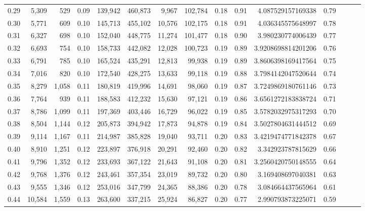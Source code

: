 \begin{tabular}{rrrrrrrrrrrrrrr}
0.29 &   5,309 &    529 &  0.09 &  139,942 &  460,873 &    9,967 &  102,784 &  0.18 &  0.91 &     4.087529157169338 &      0.79 \\
0.30 &   5,771 &    609 &  0.10 &  145,713 &  455,102 &   10,576 &  102,175 &  0.18 &  0.91 &     4.036345575648997 &      0.78 \\
0.31 &   6,327 &    698 &  0.10 &  152,040 &  448,775 &   11,274 &  101,477 &  0.18 &  0.90 &     3.980230774006439 &      0.77 \\
0.32 &   6,693 &    754 &  0.10 &  158,733 &  442,082 &   12,028 &  100,723 &  0.19 &  0.89 &    3.9208698814201206 &      0.76 \\
0.33 &   6,791 &    785 &  0.10 &  165,524 &  435,291 &   12,813 &   99,938 &  0.19 &  0.89 &    3.8606398169417564 &      0.75 \\
0.34 &   7,016 &    820 &  0.10 &  172,540 &  428,275 &   13,633 &   99,118 &  0.19 &  0.88 &    3.7984142047520644 &      0.74 \\
0.35 &   8,279 &  1,058 &  0.11 &  180,819 &  419,996 &   14,691 &   98,060 &  0.19 &  0.87 &    3.7249869180761146 &      0.73 \\
0.36 &   7,764 &    939 &  0.11 &  188,583 &  412,232 &   15,630 &   97,121 &  0.19 &  0.86 &    3.6561272183838724 &      0.71 \\
0.37 &   8,786 &  1,099 &  0.11 &  197,369 &  403,446 &   16,729 &   96,022 &  0.19 &  0.85 &    3.5782032975317293 &      0.70 \\
0.38 &   8,504 &  1,144 &  0.12 &  205,873 &  394,942 &   17,873 &   94,878 &  0.19 &  0.84 &    3.5027804631444512 &      0.69 \\
0.39 &   9,114 &  1,167 &  0.11 &  214,987 &  385,828 &   19,040 &   93,711 &  0.20 &  0.83 &    3.4219474771842378 &      0.67 \\
0.40 &   8,910 &  1,251 &  0.12 &  223,897 &  376,918 &   20,291 &   92,460 &  0.20 &  0.82 &     3.342923787815629 &      0.66 \\
0.41 &   9,796 &  1,352 &  0.12 &  233,693 &  367,122 &   21,643 &   91,108 &  0.20 &  0.81 &    3.2560420750148555 &      0.64 \\
0.42 &   9,768 &  1,376 &  0.12 &  243,461 &  357,354 &   23,019 &   89,732 &  0.20 &  0.80 &     3.169408697040381 &      0.63 \\
0.43 &   9,555 &  1,346 &  0.12 &  253,016 &  347,799 &   24,365 &   88,386 &  0.20 &  0.78 &     3.084664437565964 &      0.61 \\
0.44 &  10,584 &  1,559 &  0.13 &  263,600 &  337,215 &   25,924 &   86,827 &  0.20 &  0.77 &     2.990793873225071 &      0.59 \\

\end{tabular}
